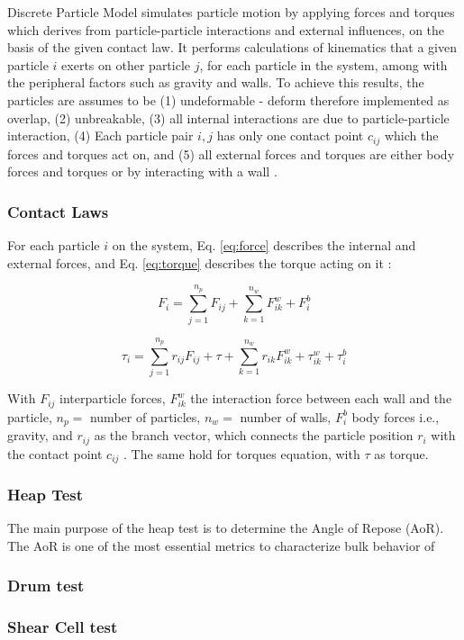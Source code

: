  Discrete Particle Model simulates particle motion by applying forces and torques which derives from particle-particle interactions and external influences, on the basis of the given contact law. It performs calculations of kinematics that a given particle $i$ exerts on other particle $j$, for each particle in the system, among with the peripheral factors such as gravity and walls. To achieve this results, the particles are assumes to be (1) undeformable - deform therefore implemented as overlap, (2) unbreakable, (3) all internal interactions are due to particle-particle interaction, (4) Each particle pair $i, j$ has only one contact point $c_{ij}$ which the forces and torques act on, and (5) all external forces and torques are either body forces and torques or by interacting with a wall \cite{MercuryDPM}. 

\subsubsection{Contact Laws}
For each particle $i$ on the system, Eq. \ref{eq:force} describes the internal and external forces, and Eq. \ref{eq:torque} describes the torque acting on it \cite{MercuryDPM}:

\begin{equation} \label{eq:force}
    F_i = \sum_{j=1}^{n_p} F_{ij} + \sum_{k=1}^{n_w} F_{ik}^w  + F_i^b
\end{equation}

\begin{equation} \label{eq:torque}
    \tau_i = \sum_{j=1}^{n_p} r_{ij}F_{ij} + \tau + \sum_{k=1}^{n_w} r_{ik}F_{ik}^w + \tau_{ik}^w +\tau_{i}^{b} 
\end{equation}

With $F_{ij}$ interparticle forces, $F_{ik}^w$ the interaction force between each wall and the particle, $n_p =$ number of particles, $n_w =$ number of walls, $F_i^b$ body forces i.e., gravity, and $r_{ij}$ as the branch vector, which connects the particle position $r_i$ with the contact point $c_{ij}$ . The same hold for torques equation, with $\tau$ as torque. 


\subsubsection{Heap Test}

The main purpose of the heap test is to determine the Angle of Repose (AoR). The AoR is one of the most essential metrics to characterize bulk behavior of 


\subsubsection{Drum test}

\subsubsection{Shear Cell test}
